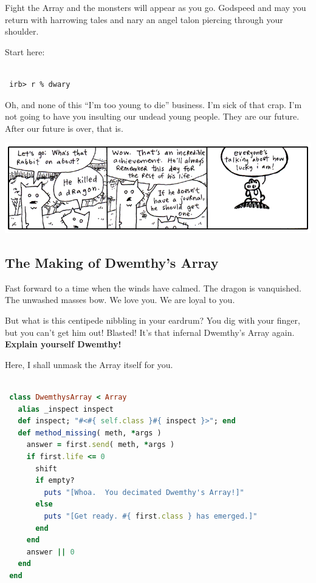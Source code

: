 \documentclass[10pt,twoside]{report}
\begin{document}
Fight the Array and the monsters will appear as you go.  Godspeed and
may you return with harrowing tales and nary an angel talon piercing
through your shoulder.

Start here:


\begin{lstlisting}

 irb> r % dwary

\end{lstlisting}


Oh, and none of this ``I'm too young to die'' business.  I'm sick of
that crap. I'm not going to have you insulting our undead young
people.  They are our future. After our future is over, that is.

	\includegraphics[width=1.0\textwidth]{cache/64.png}



\subsection{The Making of Dwemthy's Array}



Fast forward to a time when the winds have calmed.  The dragon is
vanquished.  The unwashed masses bow.  We love you. We are loyal to
you.

But what is this centipede nibbling in your eardrum?  You dig with
your finger, but you can't get him out!  Blasted!  It's that infernal
Dwemthy's Array again.  {\bf Explain yourself Dwemthy!}

Here, I shall unmask the Array itself for you.


\begin{lstlisting}[basicstyle=\ttfamily\color{basiccolor},
    commentstyle = \ttfamily\color{commentcolor},
    keywordstyle=\ttfamily\color{keywordscolor},
    stringstyle=\color{stringcolor},
    language=Ruby,
    basicstyle=\small\ttfamily,
    showstringspaces=false,
  ]

 class DwemthysArray < Array
   alias _inspect inspect
   def inspect; "#<#{ self.class }#{ inspect }>"; end
   def method_missing( meth, *args )
     answer = first.send( meth, *args )
     if first.life <= 0
       shift
       if empty?
         puts "[Whoa.  You decimated Dwemthy's Array!]"
       else
         puts "[Get ready. #{ first.class } has emerged.]"
       end
     end
     answer || 0
   end
 end

\end{lstlisting}
\end{document}
